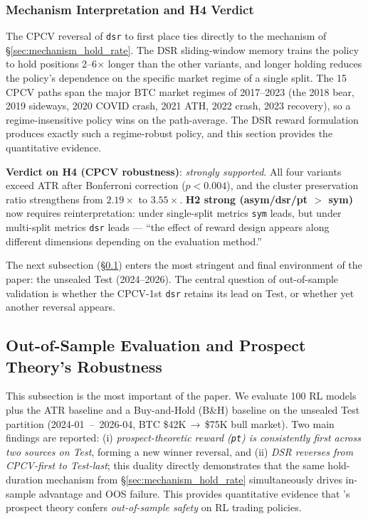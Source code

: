 \documentclass[11pt, a4paper]{article}
\begin{document}
\subsubsection{Mechanism Interpretation and H4 Verdict}
\label{sec:cpcv_mechanism}

The CPCV reversal of \texttt{dsr} to first place ties directly to the
mechanism of \S\ref{sec:mechanism_hold_rate}. The DSR sliding-window memory
trains the policy to hold positions 2--6$\times$ longer than the other
variants, and longer holding reduces the policy's dependence on the specific
market regime of a single split. The 15 CPCV paths span the major BTC market
regimes of 2017--2023 (the 2018 bear, 2019 sideways, 2020 COVID crash, 2021
ATH, 2022 crash, 2023 recovery), so a regime-insensitive policy wins on the
path-average. The DSR reward formulation produces exactly such a regime-robust
policy, and this section provides the quantitative evidence.

\textbf{Verdict on H4 (CPCV robustness)}: \emph{strongly supported}. All four
variants exceed ATR after Bonferroni correction ($p < 0.004$), and the
cluster preservation ratio strengthens from $2.19\times$ to $3.55\times$.
\textbf{H2 strong (asym/dsr/pt $>$ sym)} now requires reinterpretation: under
single-split metrics \texttt{sym} leads, but under multi-split metrics
\texttt{dsr} leads --- ``the effect of reward design appears along different
dimensions depending on the evaluation method.''

The next subsection (\S\ref{sec:oos}) enters the most stringent and final
environment of the paper: the unsealed Test (2024--2026). The central question
of out-of-sample validation is whether the CPCV-1st \texttt{dsr} retains its
lead on Test, or whether yet another reversal appears.

\subsection{Out-of-Sample Evaluation and Prospect Theory's Robustness}
\label{sec:oos}

This subsection is the most important of the paper. We evaluate 100 RL models
plus the ATR baseline and a Buy-and-Hold (B\&H) baseline on the unsealed
Test partition (2024-01 \,--\, 2026-04, BTC \$42K\,$\to$\,\$75K bull market).
Two main findings are reported: (i) \emph{prospect-theoretic reward
(\texttt{pt}) is consistently first across two sources on Test}, forming a
new winner reversal, and (ii) \emph{DSR reverses from CPCV-first to
Test-last}; this duality directly demonstrates that the same hold-duration
mechanism from \S\ref{sec:mechanism_hold_rate} simultaneously drives in-sample
advantage and OOS failure. This provides quantitative evidence that
\citet{kahneman1979prospect}'s prospect theory confers \emph{out-of-sample
safety} on RL trading policies.
\end{document}
